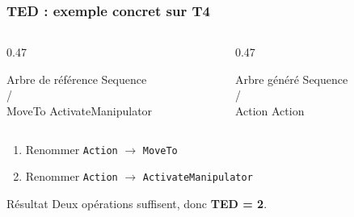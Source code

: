 \documentclass[aspectratio=169]{beamer}
\begin{document}
\begin{frame}
  \frametitle{TED : exemple concret sur T4}

  \begin{columns}[T]
    \begin{column}{0.47\textwidth}
      \begin{block}{Arbre de référence}
        \ttfamily\small
        Sequence\\
        / \hspace{3.5em} \\
        MoveTo \hspace{1em} ActivateManipulator
      \end{block}
    \end{column}
    \begin{column}{0.47\textwidth}
      \begin{block}{Arbre généré}
        \ttfamily\small
        Sequence\\
        / \hspace{3.5em} \\
        Action \hspace{1.8em} Action
      \end{block}
    \end{column}
  \end{columns}

  \vspace{0.4em}
  \begin{enumerate}
    \item Renommer \texttt{Action} $\rightarrow$ \texttt{MoveTo}
    \item Renommer \texttt{Action} $\rightarrow$ \texttt{ActivateManipulator}
  \end{enumerate}

  \vspace{0.3em}
  \begin{alertblock}{Résultat}
    \small
    Deux opérations suffisent, donc \textbf{TED = 2}.
  \end{alertblock}
\end{frame}
\end{document}
